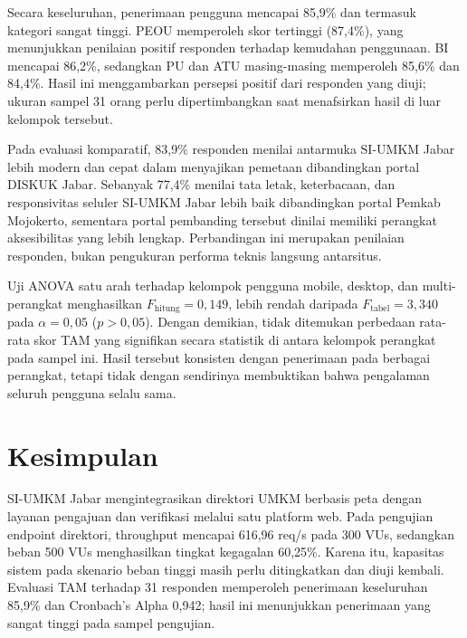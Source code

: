 \documentclass[conference]{IEEEtran}
\begin{document}
Secara keseluruhan, penerimaan pengguna mencapai 85,9\% dan termasuk kategori sangat tinggi. PEOU memperoleh skor tertinggi (87,4\%), yang menunjukkan penilaian positif responden terhadap kemudahan penggunaan. BI mencapai 86,2\%, sedangkan PU dan ATU masing-masing memperoleh 85,6\% dan 84,4\%. Hasil ini menggambarkan persepsi positif dari responden yang diuji; ukuran sampel 31 orang perlu dipertimbangkan saat menafsirkan hasil di luar kelompok tersebut.

Pada evaluasi komparatif, 83,9\% responden menilai antarmuka SI-UMKM Jabar lebih modern dan cepat dalam menyajikan pemetaan dibandingkan portal DISKUK Jabar. Sebanyak 77,4\% menilai tata letak, keterbacaan, dan responsivitas seluler SI-UMKM Jabar lebih baik dibandingkan portal Pemkab Mojokerto, sementara portal pembanding tersebut dinilai memiliki perangkat aksesibilitas yang lebih lengkap. Perbandingan ini merupakan penilaian responden, bukan pengukuran performa teknis langsung antarsitus.

Uji ANOVA satu arah terhadap kelompok pengguna mobile, desktop, dan multi-perangkat menghasilkan $F_{\text{hitung}}=0,149$, lebih rendah daripada $F_{\text{tabel}}=3,340$ pada $\alpha=0,05$ ($p>0,05$). Dengan demikian, tidak ditemukan perbedaan rata-rata skor TAM yang signifikan secara statistik di antara kelompok perangkat pada sampel ini. Hasil tersebut konsisten dengan penerimaan pada berbagai perangkat, tetapi tidak dengan sendirinya membuktikan bahwa pengalaman seluruh pengguna selalu sama.

\section{Kesimpulan}
SI-UMKM Jabar mengintegrasikan direktori UMKM berbasis peta dengan layanan pengajuan dan verifikasi melalui satu platform web. Pada pengujian endpoint direktori, throughput mencapai 616,96 req/s pada 300 VUs, sedangkan beban 500 VUs menghasilkan tingkat kegagalan 60,25\%. Karena itu, kapasitas sistem pada skenario beban tinggi masih perlu ditingkatkan dan diuji kembali. Evaluasi TAM terhadap 31 responden memperoleh penerimaan keseluruhan 85,9\% dan Cronbach's Alpha 0,942; hasil ini menunjukkan penerimaan yang sangat tinggi pada sampel pengujian.
\end{document}
